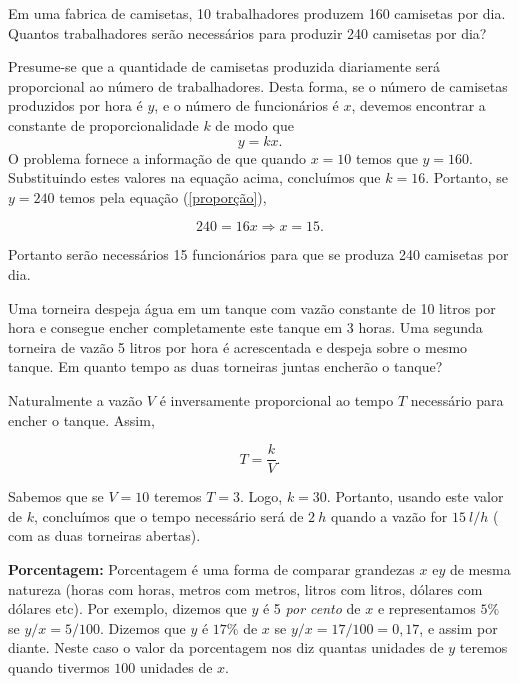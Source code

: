\begin{exemplo} Em uma fabrica de camisetas, 10 trabalhadores produzem 160 camisetas por dia. Quantos trabalhadores serão necessários para produzir 240 camisetas por dia?

Presume-se que a quantidade de camisetas  produzida diariamente será proporcional ao número de trabalhadores. Desta forma,
se o número de camisetas produzidos por hora é $y$, e o número de funcionários é $x$, devemos encontrar a constante de proporcionalidade $k$ de modo que
\begin{equation}\label{proporção}y=kx.\end{equation}
O problema fornece a informação de que quando $x=10$ temos que $y=160$. Substituindo estes valores na equação acima, concluímos que $k=16$. Portanto, se $y=240$ temos pela equação (\ref{proporção}),

$$240= 16x\Rightarrow x=15.$$

Portanto serão necessários 15 funcionários para que se produza 240 camisetas por dia.
\end{exemplo}

\begin{exemplo} Uma torneira despeja água em um tanque com vazão constante de 10 litros por hora e consegue encher completamente este tanque em 3 horas. Uma segunda torneira de vazão 5 litros por hora é acrescentada e despeja sobre o mesmo tanque. Em quanto tempo as duas torneiras juntas encherão o tanque?

Naturalmente a vazão $V$ é inversamente proporcional ao tempo $T$ necessário para encher o tanque. Assim,

$$T=\frac{k}{V}.$$

Sabemos que se $V=10$ teremos $T=3$. Logo, $k=30$. Portanto, usando este valor de $k$, concluímos que o tempo necessário será de $2\ h$ quando a vazão for  $15\  l/h$ ( com as duas torneiras abertas).

\end{exemplo}



\noindent\textbf{Porcentagem:} Porcentagem é uma forma de comparar grandezas $x$ e$ y$ de mesma natureza (horas com horas, metros com metros, litros com litros, dólares com dólares etc).  Por exemplo, dizemos que $y$ é 5 \textit{por cento} de $x$ e representamos $5\%$  se $y/x=5/100$. Dizemos que $y$ é $17\%$ de $x$  se $y/x=17/100=0,17$, e assim por diante. Neste caso
o valor da porcentagem nos diz quantas unidades de $y$ teremos quando tivermos $100$ unidades de $x$.


